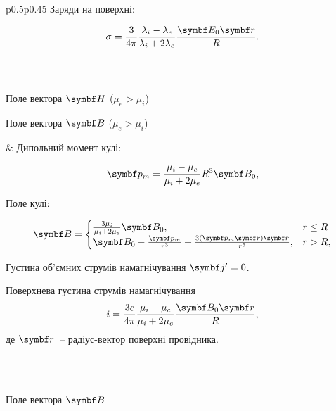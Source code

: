 \begin{center}
\begin{longtable}{p{}p{}}
		Заряди на поверхні:

		\[\sigma = \frac{3}{4\pi} \frac{\lambda_i - \lambda_e}{\lambda_i + 2\lambda_e} \frac{\Efield_0\vect{r}}{R}.\]
		\\
		\pagebreak
		                \\

		\begin{center}
			Поле вектора $\Hfield$ ($\mu_e > \mu_i$)
		\end{center}

		\begin{center}
			
		\end{center}

		\begin{center}
			Поле вектора $\Bfield$ ($\mu_e > \mu_i$)
		\end{center}

		\begin{center}
			
		\end{center}

		 &
		Дипольний момент кулі:

		\[\vect{p}_m = \frac{\mu_i - \mu_e}{\mu_i + 2\mu_e}R^3\Bfield_0,\]

		Поле кулі:

		\[
			\Bfield =
			\begin{cases}
				\frac{3\mu_i}{\mu_i + 2\mu_e} \Bfield_0,                                                    & r \le R \\
				\Bfield_0 - \frac{\vect{p}_m}{r^3} + \frac{3\left(\vect{p}_m\vect{r}\right)\vect{r} }{r^5}, & r > R,
			\end{cases}
		\]

		Густина об'ємних струмів намагнічування $\vect{j}' = 0$.

		Поверхнева густина струмів намагнічування
		\[i = \frac{3c}{4\pi} \frac{\mu_i - \mu_e}{\mu_i + 2\mu_e} \frac{\Bfield_0\vect{r}}{R},\]
		де $\vect{r}$~-- радіус-вектор поверхні провідника.

		\\
		 \\

		\begin{center}
			Поле вектора $\Bfield$
		\end{center}


\end{longtable}
\end{center}
